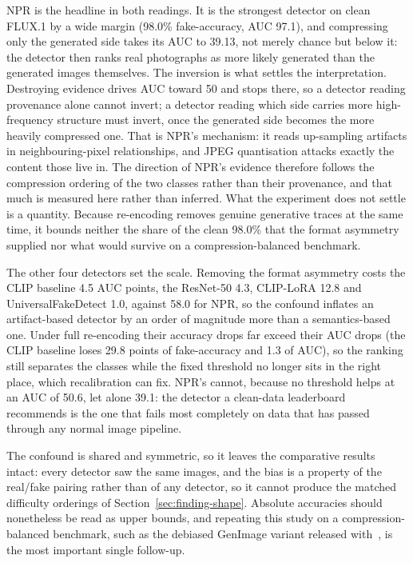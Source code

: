 \documentclass[3p,times,procedia]{elsarticle}
\begin{document}
NPR is the headline in both readings. It is the strongest detector on
clean FLUX.1 by a wide margin (98.0\% fake-accuracy, AUC 97.1), and
compressing only the generated side takes its AUC to 39.13, not merely
chance but below it: the detector then ranks real photographs as more
likely generated than the generated images themselves. The inversion is what
settles the interpretation. Destroying evidence drives AUC toward 50 and
stops there, so a detector reading provenance alone cannot invert; a
detector reading which side carries more high-frequency structure must
invert, once the generated side becomes the more heavily compressed one.
That is NPR's mechanism: it reads up-sampling artifacts in
neighbouring-pixel relationships, and JPEG quantisation attacks exactly
the content those live in. The direction of NPR's evidence therefore
follows the compression ordering of the two classes rather than their
provenance, and that much is measured here rather than inferred. What the
experiment does not settle is a quantity. Because re-encoding removes
genuine generative traces at the same time, it bounds neither the share of
the clean 98.0\% that the format asymmetry supplied nor what would survive
on a compression-balanced benchmark.

The other four detectors set the scale. Removing the format asymmetry
costs the CLIP baseline 4.5 AUC points, the ResNet-50 4.3, CLIP-LoRA 12.8
and UniversalFakeDetect 1.0, against 58.0 for NPR, so the confound
inflates an artifact-based detector by an order of magnitude more than a
semantics-based one. Under full re-encoding their accuracy drops far
exceed their AUC drops (the CLIP baseline loses 29.8 points of
fake-accuracy and 1.3 of AUC), so the ranking still separates the classes
while the fixed threshold no longer sits in the right place, which
recalibration can fix. NPR's cannot, because no threshold helps at an AUC
of 50.6, let alone 39.1: the detector a clean-data leaderboard recommends
is the one that fails most completely on data that has passed through any
normal image pipeline.

The confound is shared and symmetric, so it leaves the comparative results
intact: every detector saw the same images, and the bias is a property of
the real/fake pairing rather than of any detector, so it cannot produce
the matched difficulty orderings of Section~\ref{sec:finding-shape}.
Absolute accuracies should nonetheless be read as upper bounds, and
repeating this study on a compression-balanced benchmark, such as the
debiased GenImage variant released with~\cite{grommelt2024jpeg}, is the
most important single follow-up.
\end{document}
